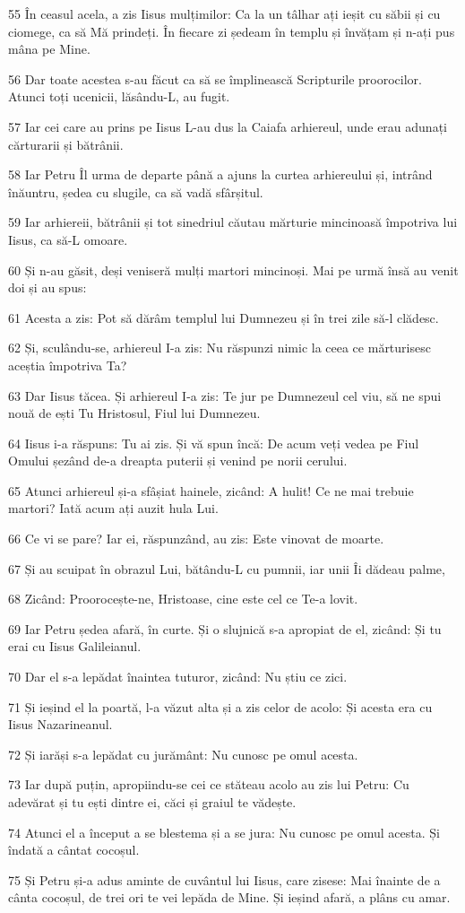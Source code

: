 \par 55 În ceasul acela, a zis Iisus mulțimilor: Ca la un tâlhar ați ieșit cu săbii și cu ciomege, ca să Mă prindeți. În fiecare zi ședeam în templu și învățam și n-ați pus mâna pe Mine.
\par 56 Dar toate acestea s-au făcut ca să se împlinească Scripturile proorocilor. Atunci toți ucenicii, lăsându-L, au fugit.
\par 57 Iar cei care au prins pe Iisus L-au dus la Caiafa arhiereul, unde erau adunați cărturarii și bătrânii.
\par 58 Iar Petru Îl urma de departe până a ajuns la curtea arhiereului și, intrând înăuntru, ședea cu slugile, ca să vadă sfârșitul.
\par 59 Iar arhiereii, bătrânii și tot sinedriul căutau mărturie mincinoasă împotriva lui Iisus, ca să-L omoare.
\par 60 Și n-au găsit, deși veniseră mulți martori mincinoși. Mai pe urmă însă au venit doi și au spus:
\par 61 Acesta a zis: Pot să dărâm templul lui Dumnezeu și în trei zile să-l clădesc.
\par 62 Și, sculându-se, arhiereul I-a zis: Nu răspunzi nimic la ceea ce mărturisesc aceștia împotriva Ta?
\par 63 Dar Iisus tăcea. Și arhiereul I-a zis: Te jur pe Dumnezeul cel viu, să ne spui nouă de ești Tu Hristosul, Fiul lui Dumnezeu.
\par 64 Iisus i-a răspuns: Tu ai zis. Și vă spun încă: De acum veți vedea pe Fiul Omului șezând de-a dreapta puterii și venind pe norii cerului.
\par 65 Atunci arhiereul și-a sfâșiat hainele, zicând: A hulit! Ce ne mai trebuie martori? Iată acum ați auzit hula Lui.
\par 66 Ce vi se pare? Iar ei, răspunzând, au zis: Este vinovat de moarte.
\par 67 Și au scuipat în obrazul Lui, bătându-L cu pumnii, iar unii Îi dădeau palme,
\par 68 Zicând: Proorocește-ne, Hristoase, cine este cel ce Te-a lovit.
\par 69 Iar Petru ședea afară, în curte. Și o slujnică s-a apropiat de el, zicând: Și tu erai cu Iisus Galileianul.
\par 70 Dar el s-a lepădat înaintea tuturor, zicând: Nu știu ce zici.
\par 71 Și ieșind el la poartă, l-a văzut alta și a zis celor de acolo: Și acesta era cu Iisus Nazarineanul.
\par 72 Și iarăși s-a lepădat cu jurământ: Nu cunosc pe omul acesta.
\par 73 Iar după puțin, apropiindu-se cei ce stăteau acolo au zis lui Petru: Cu adevărat și tu ești dintre ei, căci și graiul te vădește.
\par 74 Atunci el a început a se blestema și a se jura: Nu cunosc pe omul acesta. Și îndată a cântat cocoșul.
\par 75 Și Petru și-a adus aminte de cuvântul lui Iisus, care zisese: Mai înainte de a cânta cocoșul, de trei ori te vei lepăda de Mine. Și ieșind afară, a plâns cu amar.

